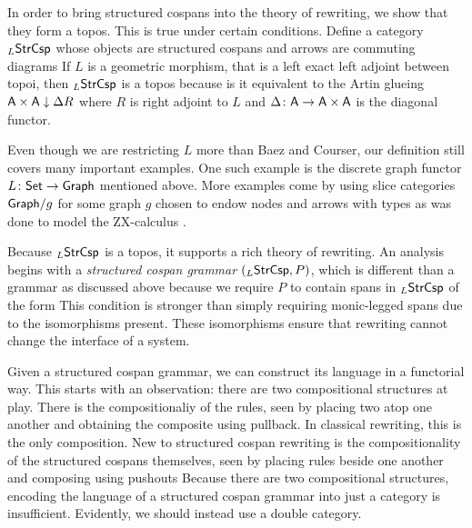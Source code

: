 \documentclass{amsart}
\begin{document}
In order to bring structured cospans into the
theory of rewriting, we show that they form a
topos. This is true under certain conditions.
Define a category $ _L\mathsf{StrCsp} $ whose objects are
structured cospans and arrows are commuting
diagrams  If $ L $
is a geometric morphism, that is a left exact left
adjoint between topoi, then $ _L\mathsf{StrCsp} $ is a topos because is
it equivalent to the Artin glueing
$ \mathsf{A} \times \mathsf{A} \downarrow \Delta R $ where $ R $
is right adjoint to $ L $ and
$ \Delta \colon \mathsf{A} \to \mathsf{A} \times \mathsf{A} $ is the
diagonal functor.

Even though we are restricting $ L $ more than
Baez and Courser, our definition still covers many
important examples.  One such example is the
discrete graph functor $ L \colon \mathsf{Set} \to \mathsf{Graph} $
mentioned above. More examples come by using slice
categories $ \mathsf{Graph} / g $ for some graph $ g $
chosen to endow nodes and arrows with types as was
done to model the ZX-calculus \cite{ZX}.

Because $ _L\mathsf{StrCsp} $ is a topos, it supports a
rich theory of rewriting. An analysis begins with
a \emph{structured cospan grammar}
$ (_L\mathsf{StrCsp}, P) $, which is different than a
grammar as discussed above because we require
$ P $ to contain spans in $ _L\mathsf{StrCsp} $ of the
form  This condition
is stronger than simply requiring monic-legged
spans due to the isomorphisms present. These
isomorphisms ensure that rewriting cannot change
the interface of a system. 

Given a structured cospan grammar, we can
construct its language in a functorial way.  This
starts with an observation: there are two
compositional structures at play. There is the
compositionaliy of the rules, seen by placing two
atop one another
 and obtaining
the composite 
using pullback. In classical rewriting, this
is the only composition.  New to structured cospan
rewriting is the compositionality of the
structured cospans themselves, seen by placing
rules beside one another
 and composing
using pushouts 
Because there are two compositional structures,
encoding the language of a structured cospan
grammar into just a category is insufficient.
Evidently, we should instead use a double
category.
\end{document}
